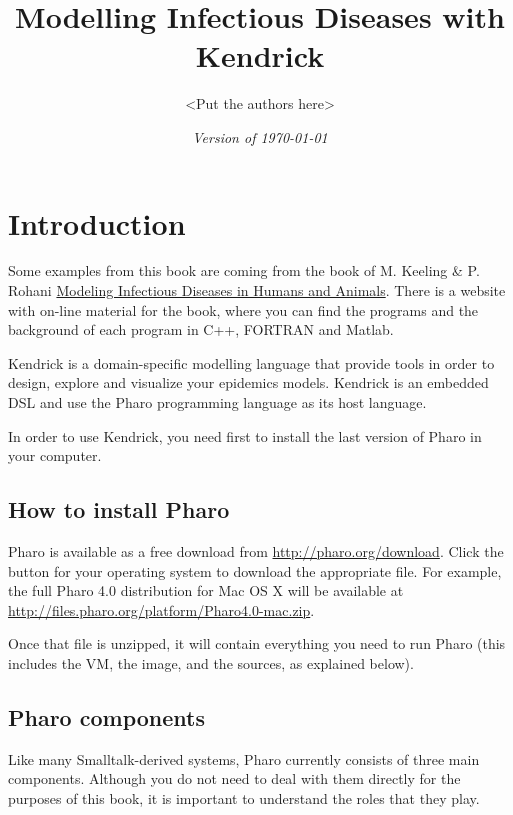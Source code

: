 \documentclass[a4paper,10pt,twoside]{book}
\begin{document}
\frontmatter
\setcounter{page}{1}
\pagestyle{headings}
\author{
  <Put the authors here>
}
\title{\Huge\bf {Modelling Infectious Diseases with Kendrick} }
\isodate
\date{\emph{Version of \today}}
\maketitle
\tableofcontents

\sloppy %
\mainmatter

\chapter{ Introduction}\label{ Introduction}
Some examples from this book are coming from the book of M. Keeling \& P. Rohani \href{http://press.princeton.edu/titles/8459.html}{Modeling Infectious Diseases in Humans and Animals}.
There is a website with on-line material for the book, where you can find the programs and the background of each program in C++, FORTRAN and Matlab.

Kendrick is a domain-specific modelling language that provide tools in order to design, explore and visualize your epidemics models. Kendrick is an embedded DSL and use the Pharo programming language as its host language.

In order to use Kendrick, you need first to install the last version of Pharo in your computer.
\section{How to install Pharo}\label{How to install Pharo}
Pharo is available as a free download from
\url{http://pharo.org/download}. Click the button for your
operating system to download the appropriate  file. For example, the
full Pharo 4.0 distribution for Mac OS X will be available at
\url{http://files.pharo.org/platform/Pharo4.0-mac.zip}.

Once that file is unzipped, it will contain everything you need to run
Pharo (this includes the VM, the image, and the sources, as explained below).
\section{Pharo components}\label{Pharo components}
Like many Smalltalk-derived systems, Pharo currently consists of three main
components. Although you do not need to deal with them directly for the purposes
of this book, it is important to understand the roles that they play.
\end{document}
